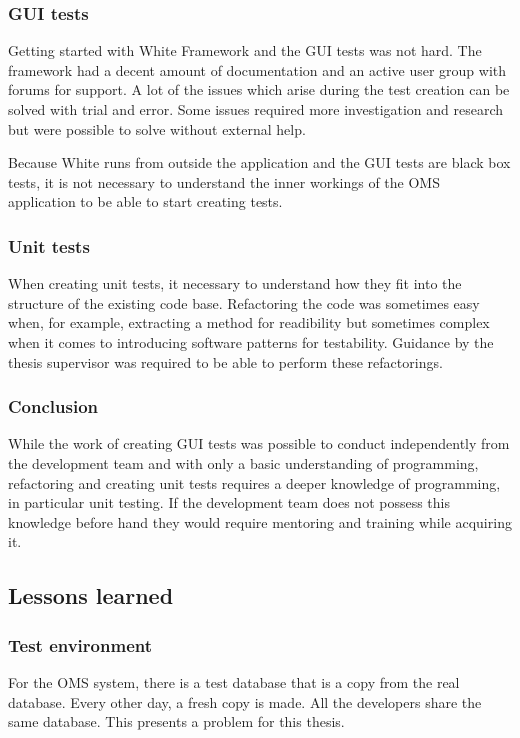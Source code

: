 \documentclass{article}
\begin{document}
			\subsubsection{GUI tests}
			Getting started with White Framework and the GUI tests was not hard. The framework had a decent amount of documentation and an active user group with forums for support. A lot of the issues which arise during the test creation can be solved with trial and error. Some issues required more investigation and research but were possible to solve without external help. 

			Because White runs from outside the application and the GUI tests are black box tests, it is not necessary to understand the inner workings of the OMS application to be able to start creating tests.

			\subsubsection{Unit tests}
			When creating unit tests, it necessary to understand how they fit into the structure of the existing code base. Refactoring the code was sometimes easy when, for example, extracting a method for readibility but sometimes complex when it comes to introducing software patterns for testability. Guidance by the thesis supervisor was required to be able to perform these refactorings.

			\subsubsection{Conclusion}
			While the work of creating GUI tests was possible to conduct independently from the development team and with only a basic understanding of programming, refactoring and creating unit tests requires a deeper knowledge of programming, in particular unit testing. If the development team does not possess this knowledge before hand they would require mentoring and training while acquiring it.

		\subsection{Lessons learned}
			\subsubsection{Test environment}
			For the OMS system, there is a test database that is a copy from the real database. Every other day, a fresh copy is made. All the developers share the same database. This presents a problem for this thesis. 
\end{document}
